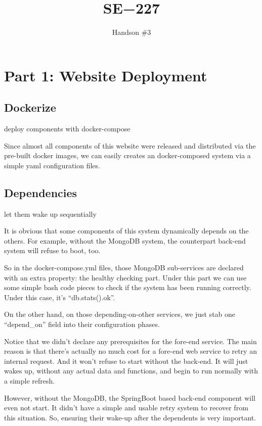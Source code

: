 \documentclass[11pt, oneside]{article}   	%
\title{SE−227}
\author{Handson \#3}
\begin{document}
\maketitle

\section{Part 1: Website Deployment}

\subsection{Dockerize}
deploy components with docker-compose
\newline

Since almost all components of this website were released and distributed via the pre-built docker images, we can easily creates an docker-composed system via a simple yaml configuration files.

\subsection{Dependencies}
let them wake up sequentially
\newline

It is obvious that some components of this system dynamically depends on the others. For example, without the MongoDB system, the counterpart back-end system will refuse to boot, too.

So in the docker-compose.yml files, those MongoDB sub-services are declared with an extra property: the healthy checking part. Under this part we can use some simple bash code pieces to check if the system has been running correctly. Under this case, it's 
``db.stats().ok''.

On the other hand, on those depending-on-other services, we just stab one ``depend\_on'' field into their configuration phases.

Notice that we didn't declare any prerequisites for the fore-end service. The main reason is that there's actually no much cost for a fore-end web service to retry an internal request. And it won't refuse to start without the back-end. It will just wakes up, without any actual data and functions, and begin to run normally with a simple refresh.

However, without the MongoDB, the SpringBoot based back-end component will even not start. It didn't have a simple and usable retry system to recover from this situation. So, ensuring their wake-up after the dependents is very important.
\end{document}
